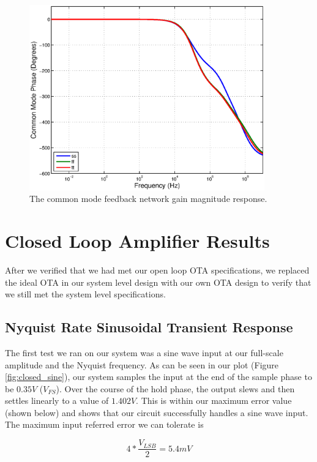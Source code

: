 \documentclass[journal]{IEEEtran}
\begin{document}
\begin{figure}
\centering
\includegraphics[width=4in]{Plots/open_cm_phase.eps}
\caption{The common mode feedback network gain magnitude response.}
\label{fig:open_cmfb_phase}
\end{figure}


\section{Closed Loop Amplifier Results}
After we verified that we had met our open loop OTA specifications, we replaced the ideal OTA in our system level design with our own OTA design to verify that we still met the system level specifications.

\subsection{Nyquist Rate Sinusoidal Transient Response}
The first test we ran on our system was a sine wave input at our full-scale amplitude and the Nyquist frequency. As can be seen in our plot (Figure \ref{fig:closed_sine}), our system samples the input at the end of the sample phase to be $0.35V$ ($V_{FS}$). Over the course of the hold phase, the output slews and then settles linearly to a value of $1.402V$. This is within our maximum error value (shown below) and shows that our circuit successfully handles a sine wave input. The maximum input referred error we can tolerate is

\begin{equation}
4*\frac{V_{LSB}}{2} = 5.4mV
\end{equation}
\end{document}
